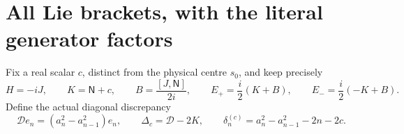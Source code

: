 \section{All Lie brackets, with the literal generator factors}

Fix a real scalar $c$, distinct from the physical centre $s_0$,
and keep precisely
\begin{equation}\label{swlie:eq:generators}
 H=-iJ,\qquad K=\mathsf N+c,\qquad
 B=\frac{[J,\mathsf N]}{2i},\qquad
 E_+=\frac i2(K+B),\qquad E_-=\frac i2(-K+B).
\end{equation}
Define the actual diagonal discrepancy
\begin{equation}\label{swlie:eq:delta}
 \mathcal D e_n=(a_n^2-a_{n-1}^2)e_n,\qquad
 \Delta_c=\mathcal D-2K,\qquad
 \delta_n^{(c)}=a_n^2-a_{n-1}^2-2n-2c.
\end{equation}

